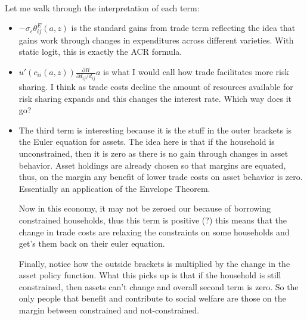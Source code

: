 \documentclass[12pt,pdftex]{article}
\begin{document}
\begin{onehalfspacing}
\begin{align}
\end{align}
Let me walk through the interpretation of each term:
\begin{itemize}
\item $-\sigma_{\epsilon} \theta^{E}_{ij}(a,z)$ is the standard gains from trade term reflecting the idea that gains work through changes in expenditures across different varieties. With static logit, this is exactly the ACR formula.
\item $u'(c_{ii}(a,z))\frac{\partial R}{\partial d_{ij} / d_{ij}}a$ is what I would call how trade facilitates more risk sharing. I think as trade costs decline the amount of resources available for risk sharing expands and this changes the interest rate. Which way does it go?

\item The third term is interesting because it is the stuff in the outer brackets is the Euler equation for assets. The idea here is that if the household is unconstrained, then it is zero as there is no gain through changes in asset behavior. Asset holdings are already chosen so that margins are equated, thus, on the margin any benefit of lower trade costs on asset behavior is zero. Essentially an application of the Envelope Theorem.

    Now in this economy, it may not be zeroed our because of borrowing constrained households, thus this term is positive (?) this means that the change in trade costs are relaxing the constraints on some households and get's them back on their euler equation.

    Finally, notice how the outside brackets is multiplied by the change in the asset policy function. What this picks up is that if the household is still constrained, then assets can't change and overall second term is zero. So the only people that benefit and contribute to social welfare are those on the margin between constrained and not-constrained.


\end{itemize}
\end{onehalfspacing}
\end{document}
